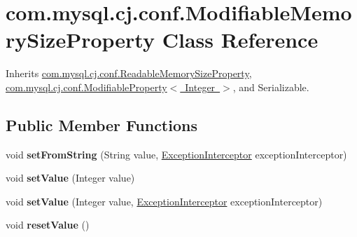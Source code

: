 \hypertarget{classcom_1_1mysql_1_1cj_1_1conf_1_1_modifiable_memory_size_property}{}\section{com.\+mysql.\+cj.\+conf.\+Modifiable\+Memory\+Size\+Property Class Reference}
\label{classcom_1_1mysql_1_1cj_1_1conf_1_1_modifiable_memory_size_property}


Inherits \mbox{\hyperlink{classcom_1_1mysql_1_1cj_1_1conf_1_1_readable_memory_size_property}{com.\+mysql.\+cj.\+conf.\+Readable\+Memory\+Size\+Property}}, \mbox{\hyperlink{interfacecom_1_1mysql_1_1cj_1_1conf_1_1_modifiable_property}{com.\+mysql.\+cj.\+conf.\+Modifiable\+Property$<$ Integer $>$}}, and Serializable.

\subsection*{Public Member Functions}
\begin{DoxyCompactItemize}
\item 
\mbox{\label{classcom_1_1mysql_1_1cj_1_1conf_1_1_modifiable_memory_size_property_afd540074a822236f5461b7a89ec49bd3}} 
void {\bfseries set\+From\+String} (String value, \mbox{\hyperlink{interfacecom_1_1mysql_1_1cj_1_1exceptions_1_1_exception_interceptor}{Exception\+Interceptor}} exception\+Interceptor)
\item 
\mbox{\label{classcom_1_1mysql_1_1cj_1_1conf_1_1_modifiable_memory_size_property_ad59087614f7875248e28ca184945853b}} 
void {\bfseries set\+Value} (Integer value)
\item 
\mbox{\label{classcom_1_1mysql_1_1cj_1_1conf_1_1_modifiable_memory_size_property_aa7aaac2a1212ab395eb104b928c71012}} 
void {\bfseries set\+Value} (Integer value, \mbox{\hyperlink{interfacecom_1_1mysql_1_1cj_1_1exceptions_1_1_exception_interceptor}{Exception\+Interceptor}} exception\+Interceptor)
\item 
\mbox{\label{classcom_1_1mysql_1_1cj_1_1conf_1_1_modifiable_memory_size_property_a2118b2d1d11e66304f167ab020efb64c}} 
void {\bfseries reset\+Value} ()
\end{DoxyCompactItemize}
